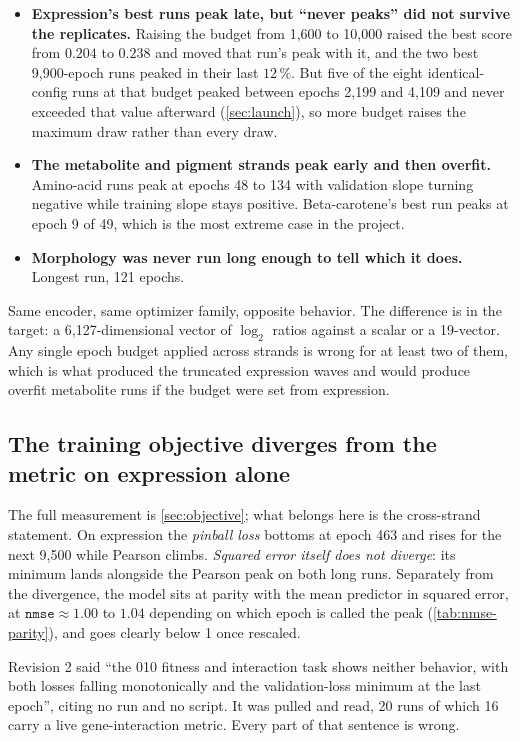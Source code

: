 \begin{itemize}
\item \textbf{Expression's best runs peak late, but ``never peaks'' did not survive the
  replicates.} Raising the budget from 1,600 to 10,000 raised the best score from $0.204$
  to $0.238$ and moved that run's peak with it, and the two best 9,900-epoch runs peaked in
  their last $12\,\%$. But five of the eight identical-config runs at that budget peaked
  between epochs 2,199 and 4,109 and never exceeded that value afterward
  (\cref{sec:launch}), so more budget raises the maximum draw rather than every draw.
\item \textbf{The metabolite and pigment strands peak early and then overfit.} Amino-acid
  runs peak at epochs 48 to 134 with validation slope turning negative while training slope
  stays positive. Beta-carotene's best run peaks at epoch 9 of 49, which is the most extreme
  case in the project.
\item \textbf{Morphology was never run long enough to tell which it does.} Longest run,
  121 epochs.
\end{itemize}

Same encoder, same optimizer family, opposite behavior. The difference is in the target: a
6,127-dimensional vector of $\log_2$ ratios against a scalar or a 19-vector. Any single
epoch budget applied across strands is wrong for at least two of them, which is what
produced the truncated expression waves and would produce overfit metabolite runs if the
budget were set from expression.

\subsection{The training objective diverges from the metric on expression alone}

The full measurement is \cref{sec:objective}; what belongs here is the cross-strand
statement. On expression the \emph{pinball loss} bottoms at epoch 463 and rises for the
next 9,500 while Pearson climbs. \emph{Squared error itself does not diverge}: its minimum
lands alongside the Pearson peak on both long runs. Separately from the divergence, the
model sits at parity with the mean predictor in squared error, at
$\texttt{nmse} \approx 1.00$ to $1.04$ depending on which epoch is called the peak
(\cref{tab:nmse-parity}), and goes clearly below 1 once rescaled.

 Revision 2 said ``the 010
fitness and interaction task shows neither behavior, with both losses falling monotonically
and the validation-loss minimum at the last epoch'', citing no run and no script. It was
pulled and read, 20 runs of which 16 carry a live gene-interaction metric. Every part of
that sentence is wrong.

